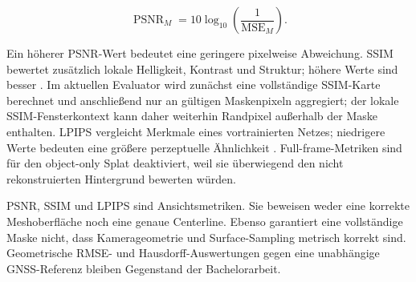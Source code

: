 \begin{equation}
	\operatorname{PSNR}_M=10\log_{10}\!\left(\frac{1}{\operatorname{MSE}_M}\right).
	\label{eq:masked-psnr}
\end{equation}

Ein höherer PSNR-Wert bedeutet eine geringere pixelweise Abweichung. SSIM
bewertet zusätzlich lokale Helligkeit, Kontrast und Struktur; höhere Werte
sind besser \parencite{wang2004ssim}. Im aktuellen Evaluator wird zunächst eine
vollständige SSIM-Karte berechnet und anschließend nur an gültigen
Maskenpixeln aggregiert; der lokale SSIM-Fensterkontext kann daher weiterhin
Randpixel außerhalb der Maske enthalten. LPIPS vergleicht Merkmale eines
vortrainierten Netzes; niedrigere Werte bedeuten eine größere perzeptuelle
Ähnlichkeit \parencite{zhang2018lpips}. Full-frame-Metriken sind
für den object-only Splat deaktiviert, weil sie überwiegend den nicht
rekonstruierten Hintergrund bewerten würden.

PSNR, SSIM und LPIPS sind Ansichtsmetriken. Sie beweisen weder eine korrekte
Meshoberfläche noch eine genaue Centerline. Ebenso garantiert eine vollständige
Maske nicht, dass Kamerageometrie und Surface-Sampling metrisch korrekt sind.
Geometrische RMSE- und Hausdorff-Auswertungen gegen eine unabhängige
GNSS-Referenz bleiben Gegenstand der Bachelorarbeit.

